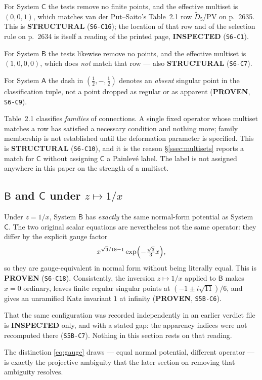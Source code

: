 For System $\mathsf C$ the tests remove no finite points, and the effective
multiset is $(0,0,1)$, which matches van der Put--Saito's Table~2.1 row
$\widetilde D_5$/PV on p.~2635. This is \textbf{STRUCTURAL}
(\texttt{S6-C16}); the location of that row and of the selection rule on
p.~2634 is itself a reading of the printed page, \textbf{INSPECTED}
(\texttt{S6-C1}).

For System $\mathsf B$ the tests likewise remove no points, and the effective
multiset is $(1,0,0,0)$, which does \emph{not} match that row --- also
\textbf{STRUCTURAL} (\texttt{S6-C7}).

For System $\mathsf A$ the dash in $(\tfrac12,-,\tfrac12)$ denotes an
\emph{absent} singular point in the classification tuple, not a point dropped
as regular or as apparent (\textbf{PROVEN}, \texttt{S6-C9}).

\begin{remark}
\label{rem:necessary}
Table~2.1 classifies \emph{families} of connections. A single fixed operator
whose multiset matches a row has satisfied a necessary condition and nothing
more; family membership is not established until the deformation parameter is
specified. This is \textbf{STRUCTURAL} (\texttt{S6-C10}), and it is the reason
\S\ref{ssec:multisets} reports a match for $\mathsf C$ without assigning
$\mathsf C$ a Painlev\'e label. The label is not assigned anywhere in this
paper on the strength of a multiset.
\end{remark}

\subsection{\texorpdfstring{$\mathsf B$ and $\mathsf C$ under $z\mapsto1/x$}%
{B and C under z to 1/x}}\label{ssec:BC}

Under $z=1/x$, System $\mathsf B$ has \emph{exactly} the same normal-form
potential as System $\mathsf C$. The two original scalar equations are
nevertheless not the same operator: they differ by the explicit gauge factor
\begin{equation}\label{eq:gauge}
  x^{\sqrt3/18-1}\exp\Bigl(-\tfrac{\sqrt3}{3}x\Bigr),
\end{equation}
so they are gauge-equivalent in normal form without being literally equal.
This is \textbf{PROVEN} (\texttt{S6-C18}). Consistently, the inversion
$z\mapsto1/x$ applied to $\mathsf B$ makes $x=0$ ordinary, leaves finite
regular singular points at $(-1\pm i\sqrt{11})/6$, and gives an unramified Katz
invariant $1$ at infinity (\textbf{PROVEN}, \texttt{S5B-C6}).

That the same configuration was recorded independently in an earlier verdict
file is \textbf{INSPECTED} only, and with a stated gap: the apparency indices
were not recomputed there (\texttt{S5B-C7}). Nothing in this section rests on
that reading.

\medskip
\noindent
The distinction \eqref{eq:gauge} draws --- equal normal potential, different
operator --- is exactly the projective ambiguity that the later section on
removing that ambiguity resolves.

